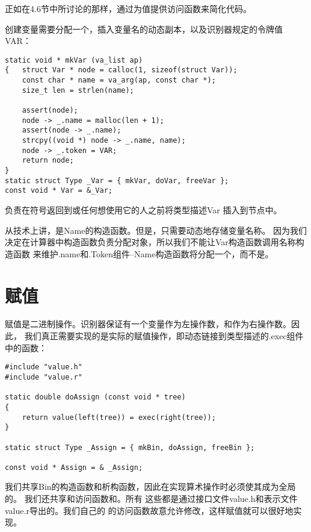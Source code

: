 正如在4.6节中所讨论的那样，通过为值提供访问函数来简化代码。

创建变量需要分配一个，插入变量名的动态副本，以及识别器规定的令牌值VAR：

\begin{lstlisting}
static void * mkVar (va_list ap)
{   struct Var * node = calloc(1, sizeof(struct Var));
    const char * name = va_arg(ap, const char *);
    size_t len = strlen(name);
    
    assert(node);
    node -> _.name = malloc(len + 1);
    assert(node -> _.name);
    strcpy((void *) node -> _.name, name);
    node -> _.token = VAR;
    return node;
}
static struct Type _Var = { mkVar, doVar, freeVar };
const void * Var = &_Var;
\end{lstlisting}

    负责在符号返回到或任何想使用它的人之前将类型描述Var
插入到节点中。

    从技术上讲，是Name的构造函数。但是，只需要动态地存储变量名称。
因为我们决定在计算器中构造函数负责分配对象，所以我们不能让Var构造函数调用名称构造函数
来维护.name和.Token组件--Name构造函数将分配一个，而不是。


\section{赋值}

    赋值是二进制操作。识别器保证有一个变量作为左操作数，和作为右操作数。因此，
我们真正需要实现的是实际的赋值操作，即动态链接到类型描述的.exec组件中的函数：

\begin{lstlisting}
#include "value.h"
#include "value.r"

static double doAssign (const void * tree)
{
    return value(left(tree)) = exec(right(tree));
}

static struct Type _Assign = { mkBin, doAssign, freeBin };

const void * Assign = & _Assign; 
\end{lstlisting}

    我们共享Bin的构造函数和析构函数，因此在实现算术操作时必须使其成为全局的。
我们还共享和访问函数和。所有
这些都是通过接口文件value.h和表示文件value.r导出的。我们自己的
的访问函数故意允许修改，这样赋值就可以很好地实现。

